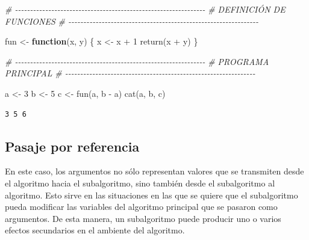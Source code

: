 \documentclass[
]{book}
\newenvironment{Shaded}{\begin{snugshade}}{\end{snugshade}}
\newcommand{\CommentTok}[1]{\textcolor[rgb]{0.56,0.35,0.01}{\textit{#1}}}
\newcommand{\ControlFlowTok}[1]{\textcolor[rgb]{0.13,0.29,0.53}{\textbf{#1}}}
\newcommand{\DecValTok}[1]{\textcolor[rgb]{0.00,0.00,0.81}{#1}}
\newcommand{\FunctionTok}[1]{\textcolor[rgb]{0.00,0.00,0.00}{#1}}
\newcommand{\NormalTok}[1]{#1}
\newcommand{\OtherTok}[1]{\textcolor[rgb]{0.56,0.35,0.01}{#1}}
\newcommand{\SpecialCharTok}[1]{\textcolor[rgb]{0.00,0.00,0.00}{#1}}
\begin{document}
\begin{Shaded}
\begin{Highlighting}[]
\CommentTok{\# {-}{-}{-}{-}{-}{-}{-}{-}{-}{-}{-}{-}{-}{-}{-}{-}{-}{-}{-}{-}{-}{-}{-}{-}{-}{-}{-}{-}{-}{-}{-}{-}{-}{-}{-}{-}{-}{-}{-}{-}{-}{-}{-}{-}{-}{-}{-}{-}{-}{-}{-}{-}{-}{-}{-}{-}{-}{-}{-}{-}{-}{-}{-}}
\CommentTok{\# DEFINICIÓN DE FUNCIONES}
\CommentTok{\# {-}{-}{-}{-}{-}{-}{-}{-}{-}{-}{-}{-}{-}{-}{-}{-}{-}{-}{-}{-}{-}{-}{-}{-}{-}{-}{-}{-}{-}{-}{-}{-}{-}{-}{-}{-}{-}{-}{-}{-}{-}{-}{-}{-}{-}{-}{-}{-}{-}{-}{-}{-}{-}{-}{-}{-}{-}{-}{-}{-}{-}{-}{-}}

\NormalTok{fun }\OtherTok{\textless{}{-}} \ControlFlowTok{function}\NormalTok{(x, y) \{}
\NormalTok{    x }\OtherTok{\textless{}{-}}\NormalTok{ x }\SpecialCharTok{+} \DecValTok{1}
    \FunctionTok{return}\NormalTok{(x }\SpecialCharTok{+}\NormalTok{ y)}
\NormalTok{\}}

\CommentTok{\# {-}{-}{-}{-}{-}{-}{-}{-}{-}{-}{-}{-}{-}{-}{-}{-}{-}{-}{-}{-}{-}{-}{-}{-}{-}{-}{-}{-}{-}{-}{-}{-}{-}{-}{-}{-}{-}{-}{-}{-}{-}{-}{-}{-}{-}{-}{-}{-}{-}{-}{-}{-}{-}{-}{-}{-}{-}{-}{-}{-}{-}{-}{-}}
\CommentTok{\# PROGRAMA PRINCIPAL}
\CommentTok{\# {-}{-}{-}{-}{-}{-}{-}{-}{-}{-}{-}{-}{-}{-}{-}{-}{-}{-}{-}{-}{-}{-}{-}{-}{-}{-}{-}{-}{-}{-}{-}{-}{-}{-}{-}{-}{-}{-}{-}{-}{-}{-}{-}{-}{-}{-}{-}{-}{-}{-}{-}{-}{-}{-}{-}{-}{-}{-}{-}{-}{-}{-}{-}}

\NormalTok{a }\OtherTok{\textless{}{-}} \DecValTok{3}
\NormalTok{b }\OtherTok{\textless{}{-}} \DecValTok{5}
\NormalTok{c }\OtherTok{\textless{}{-}} \FunctionTok{fun}\NormalTok{(a, b }\SpecialCharTok{{-}}\NormalTok{ a)}
\FunctionTok{cat}\NormalTok{(a, b, c)}
\end{Highlighting}
\end{Shaded}

\begin{verbatim}
3 5 6
\end{verbatim}

\hypertarget{pasaje-por-referencia}{%
\subsection{Pasaje por referencia}\label{pasaje-por-referencia}}

En este caso, los argumentos no sólo representan valores que se transmiten desde el algoritmo hacia el subalgoritmo, sino también desde el subalgoritmo al algoritmo. Esto sirve en las situaciones en las que se quiere que el subalgoritmo pueda modificar las variables del algoritmo principal que se pasaron como argumentos. De esta manera, un subalgoritmo puede producir uno o varios efectos secundarios en el ambiente del algoritmo.
\end{document}
